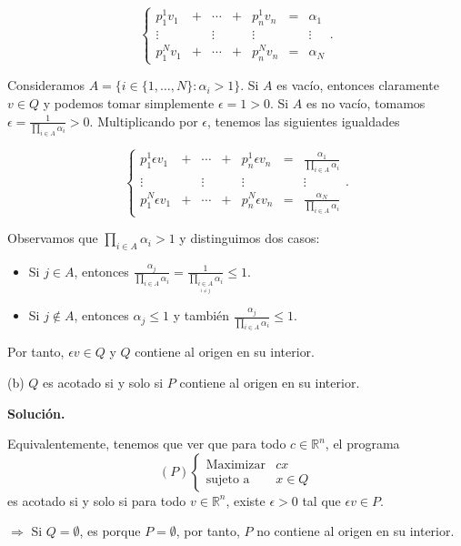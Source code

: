 \documentclass[10pt,a4paper]{article}
\begin{document}
$$\left\{\begin{array}{ccccccc}p_1^1v_1 &  + & \cdots & + & p_n^1v_n & = & \alpha_1\\
\vdots &  & \vdots &  & \vdots &  & \vdots\\
p_1^Nv_1 & + & \cdots &  + & p_n^Nv_n & = & \alpha_N\end{array}\right..$$

Consideramos $A=\{i\in\{1,\ldots, N\} : \alpha_i>1\}$. Si $A$ es vacío, entonces claramente $v\in Q$ y podemos tomar simplemente $\epsilon=1>0$. Si $A$ es no vacío, tomamos $\epsilon=\frac{1}{\prod\limits_{i\in A}\alpha_i}>0$. Multiplicando por $\epsilon$, tenemos las siguientes igualdades

$$\left\{\begin{array}{ccccccc}p_1^1\epsilon v_1 &  + & \cdots & + & p_n^1\epsilon v_n & = & \frac{\alpha_1}{\prod\limits_{i\in A}\alpha_i}\\
\vdots &  & \vdots &  & \vdots &  & \vdots\\
p_1^N\epsilon v_1 & + & \cdots &  + & p_n^N\epsilon v_n & = & \frac{\alpha_N}{\prod\limits_{i\in A}\alpha_i}\end{array}\right..$$

Observamos que $\prod\limits_{i\in A}\alpha_i> 1$ y distinguimos dos casos:
\begin{itemize}
\item Si $j\in A$, entonces $\frac{\alpha_j}{\prod\limits_{i\in A}\alpha_i}=\frac{1}{\prod\limits_{\underset{i\neq j}{i\in A}}\alpha_i}\leq 1$.
\item Si $j\notin A$, entonces $\alpha_j\leq 1$ y también $\frac{\alpha_j}{\prod_{i\in A}\alpha_i}\leq 1$.
\end{itemize}

Por tanto, $\epsilon v\in Q$ y $Q$ contiene al origen en su interior.


(b) $Q$ es acotado si y solo si $P$ contiene al origen en su interior.

\textbf{Solución.}

Equivalentemente, tenemos que ver que para todo $c\in\mathbb{R}^n$, el programa $$(P)\left\{\begin{array}{cc}\text{Maximizar} & cx\\
\text{sujeto a} & x\in Q
\end{array}\right.$$ es acotado si y solo si para todo $v\in \mathbb{R}^n$, existe $\epsilon>0$ tal que $\epsilon v\in P$.

$\Longrightarrow$ Si $Q=\emptyset$, es porque $P=\emptyset$, por tanto, $P$ no contiene al origen en su interior.
\end{document}
